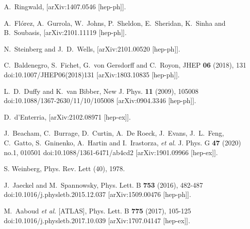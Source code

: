 
\begin{thebibliography}{1}

    A.~Ringwald,
    [arXiv:1407.0546 [hep-ph]].
    
    A.~Fl\'orez, A.~Gurrola, W.~Johns, P.~Sheldon, E.~Sheridan, K.~Sinha and B.~Soubasis,
    [arXiv:2101.11119 [hep-ph]].
    
    N.~Steinberg and J.~D.~Wells,
    [arXiv:2101.00520 [hep-ph]].
    
    C.~Baldenegro, S.~Fichet, G.~von Gersdorff and C.~Royon,
    JHEP \textbf{06} (2018), 131
    doi:10.1007/JHEP06(2018)131
    [arXiv:1803.10835 [hep-ph]].
    
    L.~D.~Duffy and K.~van Bibber,
    New J. Phys. \textbf{11} (2009), 105008
    doi:10.1088/1367-2630/11/10/105008
    [arXiv:0904.3346 [hep-ph]].
    
    D.~d'Enterria,
    [arXiv:2102.08971 [hep-ex]].
    
    J.~Beacham, C.~Burrage, D.~Curtin, A.~De Roeck, J.~Evans, J.~L.~Feng, C.~Gatto, S.~Gninenko, A.~Hartin and I.~Irastorza, \textit{et al.}
    J. Phys. G \textbf{47} (2020) no.1, 010501
    doi:10.1088/1361-6471/ab4cd2
    [arXiv:1901.09966 [hep-ex]].
    
    S. Weinberg, Phys. Rev. Lett (40), 1978.
    
    J.~Jaeckel and M.~Spannowsky,
    Phys. Lett. B \textbf{753} (2016), 482-487
    doi:10.1016/j.physletb.2015.12.037
    [arXiv:1509.00476 [hep-ph]].
    
    M.~Aaboud \textit{et al.} [ATLAS],
    Phys. Lett. B \textbf{775} (2017), 105-125
    doi:10.1016/j.physletb.2017.10.039
    [arXiv:1707.04147 [hep-ex]].
    

\end{thebibliography}
